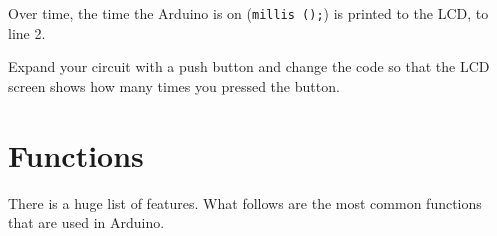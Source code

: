 \documentclass{arduino}
\begin{document}
\begin{widebox}
Over time, the time the Arduino is on (\lstinline{millis ();}) is printed to the LCD, to line 2.

\begin{alphalist}
\item Expand your circuit with a push button and change the code so that the LCD screen shows how many times you pressed the button.
\end{alphalist}
\end{widebox}

\newpage

\section{Functions}

\begin{widebox}
There is a huge list of features. What follows are the most common functions that are used in Arduino.


\end{widebox}
\end{document}
